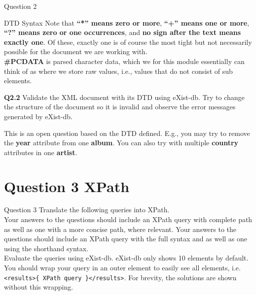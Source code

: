 \begin{frame}[fragile]{Question 2}
\begin{block}{DTD Syntax}
Note that \textbf{``*'' means zero or more}, \textbf{``+'' means one or more}, \textbf{``?'' means zero or one occurrences}, and \textbf{no sign after the text means exactly one}. 
Of these, exactly one is of course the most tight but not necessarily possible for the document we are working with. \\
\textbf{\#PCDATA} is parsed character data, which we for this module essentially can think of as where we store raw values, i.e., values that do not consist of sub elements.
\end{block}	

\textbf{Q2.2} Validate the XML document with its DTD using eXist-db. Try to change the structure of the document so it is invalid and observe the error messages generated by eXist-db.
\begin{block}{}
	This is an open question based on the DTD defined. E.g., you may try to remove the \textbf{year} attribute from one \textbf{album}. You can also try with multiple \textbf{country} attributes in one \textbf{artist}.
\end{block}	
\end{frame}


\section*{Question 3 XPath}

\begin{frame}[fragile]{Question 3}
Translate the following queries into XPath.\\\vspace{5pt}
Your answers to the questions should include an XPath query with complete path as well as one with a more concise
path, where relevant. Your answers to the questions should include an XPath query with the full syntax and as
well as one using the shorthand syntax.\\\vspace{5pt}
Evaluate the queries using eXist-db. eXist-db only shows 10 elements by default. You should wrap your query in
an outer element to easily see all elements, i.e. \texttt{<results>\{ XPath query \}</results>}. For brevity, the solutions
are shown without this wrapping.\\\vspace{5pt}
\end{frame}


